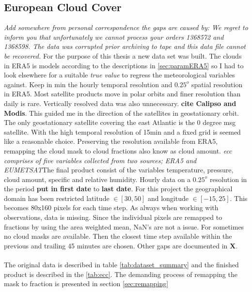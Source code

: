 \subsection{European Cloud Cover}
\textit{Add somewhere from personal correspondence the gaps are caused by: We regret to inform you that unfortunately we cannot process your orders 1368572 and 1368598. The data was corrupted prior archiving to tape and this data file cannot be recovered. }
For the purpose of this thesis a new data set was built. The clouds in ERA5 is models according to the descriptions in \ref{sec:paramERA5} so I had to look elsewhere for a suitable \textit{true value} to regress the meteorological variables against. Keep in min the hourly temporal resolution and $0.25^o$ spatial resolution in ERA5. Most satellite products move in polar orbits and finer resolution than daily is rare. Vertically resolved data was also unnecessary. \textbf{cite Calipso and Modis}. This guided me in the direction of the satellites in geostationary orbit. The only geostationary satellite covering the east Atlantic is the 0 degree \acrfull{msg} satellite. With the high temporal resolution of 15min and a fixed grid is seemed like a reasonable choice. %
Preserving the resolution available from ERA5, remapping the cloud mask to cloud fractions also know as cloud amount. \textit{\acrshort{ecc} comprises of five variables collected from two sources; ERA5 and EUMETSAT}The final product consist of the variables temperature, pressure, cloud amount, specific and relative humidity. Hourly data on a $0.25^o$ resolution in the period \textbf{put in first date} to \textbf{last date}. 
For this project the geographical domain has been restricted latitude $\in[30,50]$ and longitude $\in [-15, 25]$. This becomes 80x160 pixels for each time step. As always when working with observations, data is missing. Since the individual pixels are remapped to fractions by using the area weighted mean, NaN's are not a issue. For sometimes no cloud masks are available. Then the closest time step available within the previous and trailing 45 minutes are chosen. Other gaps are documented in \textbf{X}. 
\\ \\
The original data is described in table \ref{tab:dataset_summary} and the finished product is described in the \ref{tab:ecc}. The demanding process of remapping the mask to fraction is presented in section \ref{sec:remapping}
